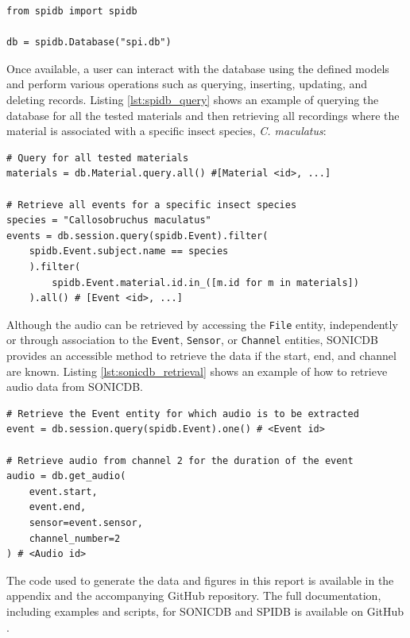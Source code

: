 \begin{listing}[htbp]
	\caption{Example of connecting to the SPIDB using Python \label{lst:spidb_connection}}
	\begin{verbatim}
from spidb import spidb 

db = spidb.Database("spi.db")
	\end{verbatim}
\end{listing}

\newpage
Once available, a user can interact with the database using the defined models and perform various operations such as querying, inserting, updating, and deleting records. Listing \ref{lst:spidb_query} shows an example of querying the database for all the tested materials and then retrieving all recordings where the material is associated with a specific insect species, \textit{C. maculatus}:

\begin{listing}[htbp]
	\caption{Example of querying the SPIDB for a specific insect species \label{lst:spidb_query}}
	\begin{verbatim}
# Query for all tested materials
materials = db.Material.query.all() #[Material <id>, ...]

# Retrieve all events for a specific insect species
species = "Callosobruchus maculatus"
events = db.session.query(spidb.Event).filter(
    spidb.Event.subject.name == species
    ).filter(
        spidb.Event.material.id.in_([m.id for m in materials])
    ).all() # [Event <id>, ...]
	\end{verbatim}
\end{listing}

Although the audio can be retrieved by accessing the \texttt{File} entity, independently or through association to the \texttt{Event}, \texttt{Sensor}, or \texttt{Channel} entities, SONICDB provides an accessible method to retrieve the data if the start, end, and channel are known. Listing \ref{lst:sonicdb_retrieval} shows an example of how to retrieve audio data from SONICDB.

\begin{listing}[htbp]
	\caption{Example of retrieving audio data from SONICDB \label{lst:sonicdb_retrieval}}
	\begin{verbatim}
# Retrieve the Event entity for which audio is to be extracted
event = db.session.query(spidb.Event).one() # <Event id>

# Retrieve audio from channel 2 for the duration of the event
audio = db.get_audio(
    event.start,
    event.end,
    sensor=event.sensor,
    channel_number=2
) # <Audio id>
	\end{verbatim}
\end{listing}

The code used to generate the data and figures in this report is available in the appendix and the accompanying GitHub repository. The full documentation, including examples and scripts, for SONICDB and SPIDB is available on GitHub \cite{danielkadyrovDkadyrovSpidbSPIDB2024}.

\newpage